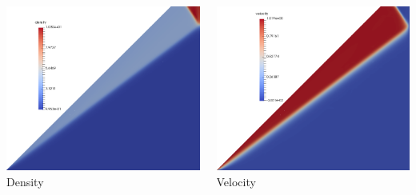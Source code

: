\documentclass[18pt,xcolor=table]{beamer}
\begin{document}
\begin{frame}[t]
\begin{columns}[t]
\begin{column}[c]{0.5\textwidth}
\centering
\includegraphics[width=\textwidth]{Piston/Piston_density.png}
\\Density
\end{column}
\begin{column}[c]{0.5\textwidth}
\centering
\includegraphics[width=\textwidth]{Piston/Piston_velocity.png}
\\Velocity
\end{column}
\end{columns}
\end{frame}
\end{document}
